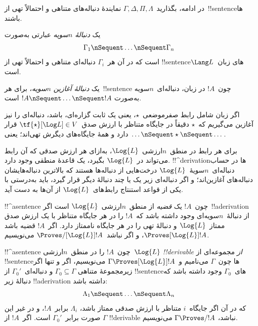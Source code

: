 \documentclass[../../../include/open-logic-section]{subfiles}
\begin{document}


در ادامه، بگذارید~$\Gamma, \Delta, \Pi, \Lambda$ نمایندهٔ دنباله‌های
متناهی و احتمالاً تهی از~!!{sentence}ها باشند.

\begin{defn}[دنباله]
یک \emph{دنبالهٔ $n$سویه} عبارتی به‌صورت
\[
\Gamma_1 \nSequent \dots \nSequent \Gamma_n
\]
است که در آن هر~$\Gamma_i$ دنباله‌ای متناهی و احتمالاً تهی از
!!{sentence}های زبان~$\Lang L$ است.
\end{defn}

\begin{defn}
یک \emph{دنبالهٔ آغازین $n$سویه}، برای هر~!!{sentence} چون~$!A$ در
زبان، دنباله‌ای~$n$سویه به‌صورت
$!A \nSequent \dots \nSequent !A$ است.

اگر زبان شامل رابط صفرموضعی~$\star$، یعنی یک ثابت گزاره‌ای، باشد،
دنباله‌ای را نیز آغازین می‌گیریم که~$\star$ دقیقاً در جایگاه متناظر با
ارزش صدق~$\tf{\star}[\Log L] \in V$ قرار دارد و همهٔ جایگاه‌های دیگرش
تهی‌اند؛ یعنی~$\dots \nSequent \star \nSequent \dots$.
\end{defn}

برای هر رابط در منطق~$n$ارزشی~$\Log{L}$، به‌ازای هر ارزش صدقی که آن
رابط می‌تواند در~$\Log{L}$ بگیرد، یک قاعدهٔ منطقی وجود دارد.
!!^{derivation}ها در حساب دنباله‌ای~$n$سویهٔ~$\Log{L}$ درخت‌هایی از
دنباله‌ها هستند که بالاترین دنباله‌هایشان دنباله‌های آغازین‌اند؛ و اگر
دنباله‌ای زیر یک یا چند دنبالهٔ دیگر قرار گیرد، باید به‌درستی با یکی از
قواعد استنتاج رابط‌های~$\Log{L}$ از آن‌ها به دست آید.

\begin{defn}[قضایا]
!!^a{sentence} چون~$!A$ یک \emph{قضیه} از منطق~$n$ارزشی~$\Log{L}$ است
اگر~!!a{derivation} از دنبالهٔ~$n$سویه‌ای وجود داشته باشد که~$!A$ را
در هر جایگاه متناظر با یک ارزش صدق ممتاز~$\Log{L}$ و دنبالهٔ تهی را در
هر جایگاه ناممتاز دارد. اگر~$!A$ قضیه باشد
$\Proves[\Log{L}] !A$، و اگر نباشد~$\Proves/[\Log{L}] !A$ می‌نویسیم.
\end{defn}

\begin{defn}[!!^{derivability}]
!!^a{sentence} چون~$!A$ را در منطق~$n$ارزشی~$\Log{L}$
\emph{!!{derivable} از} مجموعه‌ای از !!{sentence}ها چون~$\Gamma$
می‌نامیم و~$\Gamma \Proves[\Log{L}] !A$ می‌نویسیم، اگر و تنها اگر زیرمجموعهٔ متناهی
$\Gamma_0 \subseteq \Gamma$ و دنباله‌ای~$\Gamma_0'$ از
!!{sentence}های~$\Gamma_0$ وجود داشته باشد که دنبالهٔ زیر
!!a{derivation} داشته باشد:
\[ \Lambda_1 \nSequent \dots \nSequent \Lambda_n \]
که در آن اگر جایگاه~$i$ متناظر با ارزش صدقی ممتاز باشد، $\Lambda_i$
برابر~$!A$، و در غیر این صورت برابر~$\Gamma_0'$ است. اگر~$!A$ از
$\Gamma$ !!{derivable} نباشد، $\Gamma \Proves/ !A$ می‌نویسیم.
\end{defn}
\end{document}

